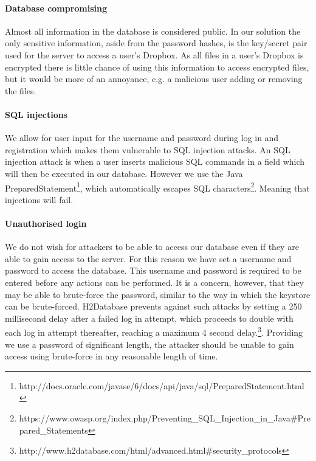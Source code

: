 \documentclass[12pt, titlepage]{article}
\begin{document}
\paragraph*{Database compromising} Almost all information in the database is considered public. In our solution the only sensitive information, aside from the password hashes, is the key/secret pair used for the server to access a user's Dropbox. As all files in a user's Dropbox is encrypted there is little chance of using this information to access encrypted files, but it would be more of an annoyance, e.g. a malicious user adding or removing the files.

\paragraph*{SQL injections} We allow for user input for the username and password during log in and registration which makes them vulnerable to SQL injection attacks. An SQL injection attack is when a user inserts malicious SQL commands in a field which will then be executed in our database. However we use the Java PreparedStatement\footnote{http://docs.oracle.com/javase/6/docs/api/java/sql/PreparedStatement.html}, which automatically escapes SQL characters\footnote{https://www.owasp.org/index.php/Preventing\_SQL\_Injection\_in\_Java\#Prepared\_Statements}. Meaning that injections will fail. 

\paragraph*{Unauthorised login} We do not wish for attackers to be able to access our database even if they are able to gain access to the server. For this reason we have set a username and password to access the database. This username and password is required to be entered before any actions can be performed. It is a concern, however, that they may be able to brute-force the password, similar to the way in which the keystore can be brute-forced. H2Database prevents against such attacks by setting a 250 millisecond delay after a failed log in attempt, which proceeds to double with each log in attempt thereafter, reaching a maximum 4 second delay.\footnote{http://www.h2database.com/html/advanced.html\#security\_protocols}. Providing we use a password of significant length, the attacker should be unable to gain access using brute-force in any reasonable length of time.
\end{document}

